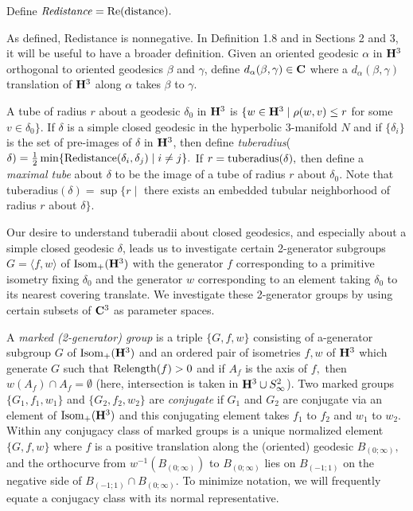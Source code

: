 Define ${\it Redistance} = {\rm Re} ({\rm distance}).$

As defined, Redistance is nonnegative.  In Definition 1.8 and in Sections 2 and 3, it will be useful to have a broader definition. Given an oriented
geodesic $\alpha$ in ${\bf H}^3$ orthogonal to oriented geodesics $\beta$ and $\gamma$, define $d_\alpha(\beta,\gamma) \in {\bf C}$ where a
$d_\alpha(\beta,\gamma)$ translation of ${\bf H}^3$  along $\alpha$ takes $\beta$ to $\gamma.$
\enddemo

A tube of radius $r$ about a geodesic $\delta_0$ in ${\bf H}^3$ is 
$\{w \in {\bf H}^3 \mid \rho(w, v) \le r$ for some $v \in \delta_0 \}.$    
If $\delta$
is a simple closed geodesic in the hyperbolic $3$-manifold $N$ and if
$\{\delta_i \}$ is the set of pre-images of $\delta$ in ${\bf H}^3$, then define
{\it tuberadius}($\delta)={1 \over 2} \min 
\{{\rm Redistance}(\delta_i,\delta_j) \mid i\neq j \}.$
If $r = {\rm tuberadius}(\delta),$ 
then define a {\it maximal tube} about $\delta$ to be the
image of a tube of radius $r$ about $\delta_0.$  Note that
tuberadius$(\delta)=
\sup\{r \mid $ there exists an embedded tubular neighborhood of
radius $r$ about $\delta \}.$
\enddemo

Our desire to understand tuberadii about closed geodesics, and especially about a simple closed geodesic $\delta$, leads us to investigate certain 2-generator subgroups $G =
\langle f,w\rangle$  of ${\rm Isom}_+({\bf H}^3)$ with the generator $f$ corresponding to a primitive isometry fixing $\delta_0$ and the generator
$w$ corresponding to an element taking $\delta_0$ to its nearest covering translate.  We investigate these 2-generator groups by using certain
subsets of ${\bf C}^3$ as parameter spaces.

A {\it marked {\rm (2-}generator\/{\rm )} group} is a triple $\{G,f,w\}$ consisting of a-generator subgroup $G$ of ${\rm Isom}_+({\bf H}^3)$
and an ordered pair of isometries $f,w$ of ${\bf H}^3$ which generate $G$  such that ${\rm Relength}(f) > 0$ and if $A_f$ is the axis of $f,$ then $w(A_f)
\cap A_f  = \emptyset$  (here, intersection is taken in ${\bf H}^3 \cup S^2_\infty$). Two marked groups $\{G_1,f_1,w_1\}$ and $\{G_2,f_2,w_2\}$
are {\it conjugate} if $G_1$ and $G_2$ are conjugate via an element of ${\rm Isom}_+({\bf H}^3)$ and this conjugating element takes $f_1$ to $f_2$
and
$w_1$ to $w_2.$  Within any conjugacy class of marked groups is a unique normalized element
$\{G,f,w\}$ where $f$ is a
positive translation  along the (oriented) geodesic $B_{(0;\infty)},$  and the
orthocurve from $w^{-1}(B_{(0;\infty)})$ to $B_{(0;\infty)}$ lies on 
$ B_{(-1;1)}$
on the negative side of $ B_{(-1;1)}\cap B_{(0;\infty)}.$  
To minimize notation, we will frequently equate a conjugacy class with its normal representative.
\enddemo

